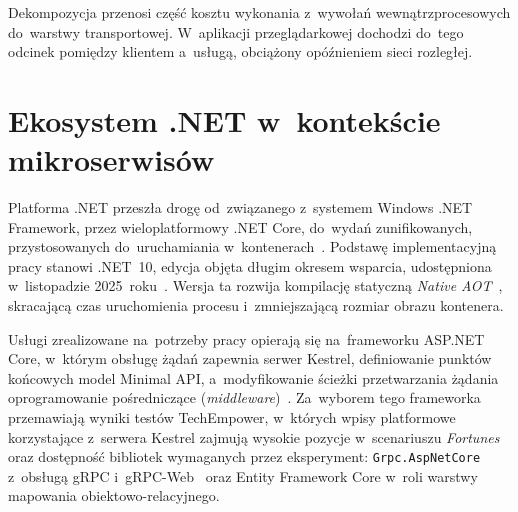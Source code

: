 Dekompozycja przenosi część kosztu wykonania z~wywołań wewnątrzprocesowych do~warstwy transportowej. W~aplikacji przeglądarkowej dochodzi do~tego odcinek pomiędzy klientem a~usługą, obciążony opóźnieniem sieci rozległej.

\section{Ekosystem .NET w~kontekście mikroserwisów}
\label{sec:EkosystemNET}

Platforma .NET przeszła drogę od~związanego z~systemem Windows .NET Framework, przez wieloplatformowy .NET Core, do~wydań zunifikowanych, przystosowanych do~uruchamiania w~kontenerach~\cite{bib:MicrosoftDocs2024}. Podstawę implementacyjną pracy stanowi .NET~10, edycja objęta długim okresem wsparcia, udostępniona w~listopadzie 2025~roku~\cite{bib:DotNetSupport}. Wersja ta rozwija kompilację statyczną \textit{Native AOT}~\cite{bib:NativeAOT}, skracającą czas uruchomienia procesu i~zmniejszającą rozmiar obrazu kontenera.

\enlargethispage{3\baselineskip}
\begin{sloppypar}
Usługi zrealizowane na~potrzeby pracy opierają się na~frameworku ASP.NET Core, w~którym obsługę żądań zapewnia serwer Kestrel, definiowanie punktów końcowych model Minimal API, a~modyfikowanie ścieżki przetwarzania żądania oprogramowanie pośredniczące (\textit{middleware})~\cite{bib:MicrosoftDocs2024}. Za~wyborem tego frameworka przemawiają wyniki testów TechEmpower, w~których wpisy platformowe korzystające z~serwera Kestrel zajmują wysokie pozycje w~scenariuszu \textit{Fortunes}~\cite{bib:TechEmpower} oraz dostępność bibliotek wymaganych przez eksperyment: \texttt{Grpc.AspNetCore} z~obsługą gRPC i~gRPC-Web~\cite{bib:GrpcWebAspNet} oraz Entity Framework Core w~roli warstwy mapowania obiektowo-relacyjnego.
\end{sloppypar}

